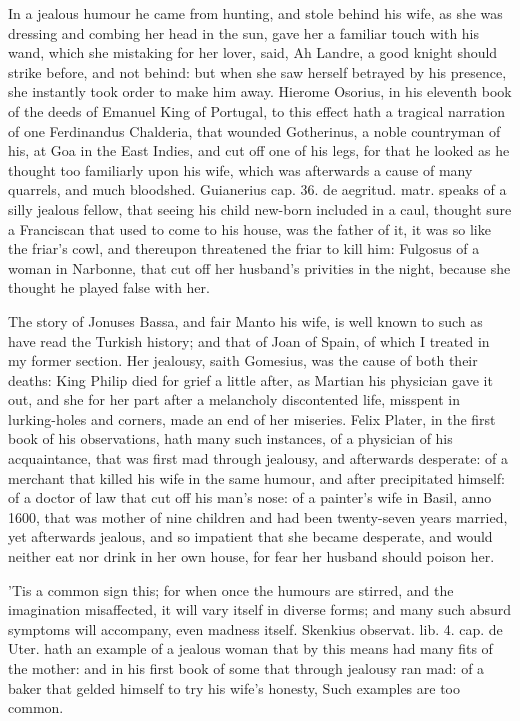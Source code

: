 In a jealous humour he came from hunting, and stole behind his wife, as
she was dressing and combing her head in the sun, gave her a familiar
touch with his wand, which she mistaking for her lover, said, Ah
Landre, a good knight should strike before, and not behind: but when
she saw herself betrayed by his presence, she instantly took order to
make him away. Hierome Osorius, in his eleventh book of the deeds of
Emanuel King of Portugal, to this effect hath a tragical narration of
one Ferdinandus Chalderia, that wounded Gotherinus, a noble countryman
of his, at Goa in the East Indies, and cut off one of his legs,
for that he looked as he thought too familiarly upon his wife, which
was afterwards a cause of many quarrels, and much bloodshed. Guianerius
cap. 36. de aegritud. matr. speaks of a silly jealous fellow, that
seeing his child new-born included in a caul, thought sure a
Franciscan that used to come to his house, was the father of it,
it was so like the friar's cowl, and thereupon threatened the friar to
kill him: Fulgosus of a woman in Narbonne, that cut off her husband's
privities in the night, because she thought he played false with her.

The story of Jonuses Bassa, and fair Manto his wife, is well known to
such as have read the Turkish history; and that of Joan of Spain, of
which I treated in my former section. Her jealousy, saith Gomesius, was
the cause of both their deaths: King Philip died for grief a little
after, as Martian his physician gave it out, and she for her part
after a melancholy discontented life, misspent in lurking-holes and
corners, made an end of her miseries. Felix Plater, in the first book
of his observations, hath many such instances, of a physician of his
acquaintance, that was first mad through jealousy, and afterwards
desperate: of a merchant that killed his wife in the same humour,
and after precipitated himself: of a doctor of law that cut off his
man's nose: of a painter's wife in Basil, anno 1600, that was mother of
nine children and had been twenty-seven years married, yet afterwards
jealous, and so impatient that she became desperate, and would neither
eat nor drink in her own house, for fear her husband should poison her.

'Tis a common sign this; for when once the humours are stirred, and the
imagination misaffected, it will vary itself in diverse forms; and many
such absurd symptoms will accompany, even madness itself. Skenkius
observat. lib. 4. cap. de Uter. hath an example of a jealous woman that
by this means had many fits of the mother: and in his first book of
some that through jealousy ran mad: of a baker that gelded himself to
try his wife's honesty, \etc{} Such examples are too common.

